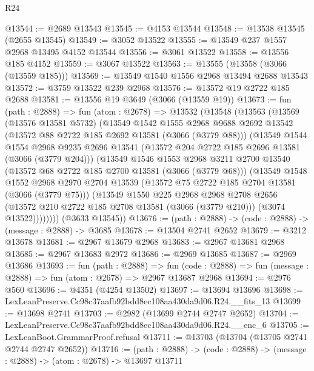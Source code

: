\begin{lexlean}{R24}
\begin{coremodule}
@13544 := @2689 @13543
@13545 := @4153 @13544
@13548 := @13538 @13545 (@2655 @13545)
@13549 := @3052 @13522
@13555 := @13549 @237 @1557 @2968 @13495 @4152 @13544
@13556 := @3061 @13522
@13558 := @13556 @185 @4152
@13559 := @3067 @13522
@13563 := @13555 (@13558 (@3066 (@13559 @185)))
@13569 := @13549 @1540 @1556 @2968 @13494 @2688 @13543
@13572 := @3759 @13522 @239 @2968
@13576 := @13572 @19 @2722 @185 @2688
@13581 := @13556 @19 @3649 (@3066 (@13559 @19))
@13673 := fun (path : @2888) =>
  fun (atom : @2678) =>
  @13532
    (@13548
      (@13563
        (@13569
          (@13576 @13581 @5732)
          (@13549
            @1542
            @1555
            @2968
            @9688
            @2692
            @13542
            (@13572 @88 @2722 @185 @2692 @13581 (@3066 (@3779 @88)))
            (@13549
              @1544
              @1554
              @2968
              @9235
              @2696
              @13541
              (@13572 @204 @2722 @185 @2696 @13581 (@3066 (@3779 @204)))
              (@13549
                @1546
                @1553
                @2968
                @3211
                @2700
                @13540
                (@13572 @68 @2722 @185 @2700 @13581 (@3066 (@3779 @68)))
                (@13549
                  @1548
                  @1552
                  @2968
                  @2970
                  @2704
                  @13539
                  (@13572 @75 @2722 @185 @2704 @13581 (@3066 (@3779 @75)))
                  (@13549
                    @1550
                    @225
                    @2968
                    @2968
                    @2708
                    @2656
                    (@13572 @210 @2722 @185 @2708 @13581 (@3066 (@3779 @210)))
                    (@3074 @13522))))))))
      (@3633 @13545))
@13676 := (path : @2888) -> (code : @2888) -> (message : @2888) -> @3685
@13678 := @13504 @2741 @2652
@13679 := @3212 @13678
@13681 := @2967 @13679 @2968
@13683 := @2967 @13681 @2968
@13685 := @2967 @13683 @2972
@13686 := @2969 @13685
@13687 := @2969 @13686
@13693 := fun (path : @2888) =>
  fun (code : @2888) => fun (message : @2888) => fun (atom : @2678) => @2967 @13687 @2968
@13694 := @2976 @560
@13696 := @4351 (@4254 @13502)
@13697 := @13694 @13696
@13698 := LexLeanPreserve.Cc98c37aafb92bdd8ec108aa430da9d06.R24.__fits_13
@13699 := @13698 @2741
@13703 := @2982 (@13699 @2744 @2747 @2652)
@13704 := LexLeanPreserve.Cc98c37aafb92bdd8ec108aa430da9d06.R24.__enc_6
@13705 := LexLeanBoot.GrammarProof.refusal
@13711 := @13703 (@13704 (@13705 @2741 @2744 @2747 @2652))
@13716 := (path : @2888) -> (code : @2888) -> (message : @2888) -> (atom : @2678) -> @13697 @13711

\end{coremodule}
\end{lexlean}
